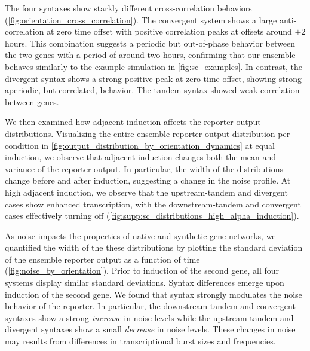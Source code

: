 \documentclass[11pt]{article} %
\begin{document}
The four syntaxes show starkly different cross-correlation behaviors (\cref{fig:orientation_cross_correlation}).  The convergent system shows a large anti-correlation at zero time offset with positive correlation peaks at offsets around \(\pm 2\) hours. This combination suggests a periodic but out-of-phase behavior between the two genes with a period of around two hours, confirming that our ensemble behaves similarly to the example simulation in \cref{fig:sc_examples}. In contrast, the divergent syntax shows a strong positive peak at zero time offset, showing strong aperiodic, but correlated, behavior. The tandem syntax showed weak correlation between genes. 

We then examined how adjacent induction affects the reporter output distributions. Visualizing the entire ensemble reporter output distribution per condition in \cref{fig:output_distribution_by_orientation_dynamics} at equal induction, we observe that adjacent induction changes both the mean and variance of the reporter output. In particular, the width of the distributions change before and after induction, suggesting a change in the noise profile. At high adjacent induction, we observe that the upstream-tandem and divergent cases show enhanced transcription, with the downstream-tandem and convergent cases effectively turning off (\cref{fig:supp:sc_distributions_high_alpha_induction}).

As noise impacts the properties of native and synthetic gene networks, we quantified the width of the these distributions by plotting the standard deviation of the ensemble reporter output as a function of time (\cref{fig:noise_by_orientation}). Prior to induction of the second gene, all four systems display similar standard deviations. Syntax differences emerge upon induction of the second gene. We found that syntax strongly modulates the noise behavior of the reporter. In particular, the downstream-tandem and convergent syntaxes show a strong \emph{increase} in noise levels while the upstream-tandem and divergent syntaxes show a small \emph{decrease} in noise levels. These changes in noise may results from differences in transcriptional burst sizes and frequencies.
\end{document}
